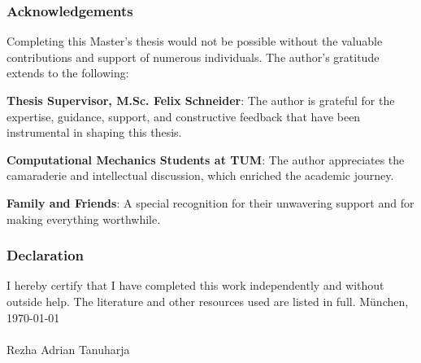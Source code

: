 %
%

\label{cha:erkl}

\subsubsection{Acknowledgements}
Completing this Master's thesis would not be possible without the valuable contributions and support of numerous individuals.
The author's gratitude extends to the following:

\textbf{Thesis Supervisor, M.Sc. Felix Schneider}: The author is grateful for the expertise, guidance, support, and constructive feedback that have been instrumental in shaping this thesis.

\textbf{Computational Mechanics Students at TUM}: The author appreciates the camaraderie and intellectual discussion, which enriched the academic journey.

\textbf{Family and Friends}: A special recognition for their unwavering support and for making everything worthwhile.

\subsubsection{Declaration}
I hereby certify that I have completed this work independently and without outside help.
The literature and other resources used are listed in full.
\vfill
M\"{u}nchen, \today \\
\vspace{3cm} \\
Rezha Adrian Tanuharja
\vfill